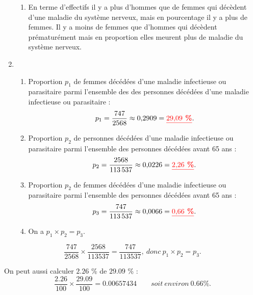 \documentclass[12pt,a4paper]{article}
\begin{document}
\begin{enumerate}[label=\arabic*.]
\begin{enumerate}[label=\alph*)]
		\item En terme d'effectifs il y a plus d'hommes que de femmes qui décèdent d'une maladie du système nerveux, mais en pourcentage il y a plus de femmes. Il y a moins de femmes que d'hommes qui décèdent prématurément mais en proportion elles meurent plus de maladie du système nerveux.
	\end{enumerate}

	\item \begin{enumerate}[label=\alph*)]
		\item Proportion $p_1$ de femmes décédées d'une maladie infectieuse ou parasitaire parmi l'ensemble des des personnes décédées d'une maladie infectieuse ou parasitaire :
		\begin{equation*}
			p_1 = \dfrac{\num{747}}{\num{2568}} \approx \num{0.2909} = \textcolor{red}{\underline{\textbf{\num{29.09} \%}}}.
		\end{equation*}
		
		\item Proportion $p_2$ de personnes décédées d'une maladie infectieuse ou parasitaire parmi l'ensemble des personnes décédées avant 65 ans :
		\begin{equation*}
			p_2 = \dfrac{\num{2568}}{\num{113537}} \approx \num{0.0226} = \textcolor{red}{\underline{\textbf{\num{2.26} \%}}}.
		\end{equation*}
		
		\item Proportion $p_2$ de femmes décédées d'une maladie infectieuse ou parasitaire parmi l'ensemble des personnes décédées avant 65 ans :
		\begin{equation*}
			p_3 = \dfrac{\num{747}}{\num{113537}} \approx \num{0.0066} = \textcolor{red}{\underline{\textbf{\num{0.66} \%}}}.
		\end{equation*}
		
		\item On a $p_1 \times p_2 = p_3$.
		
	\end{enumerate}
\end{enumerate}

\begin{myrem}
	\begin{equation*}
		\dfrac{\num{747}}{\num{2568}} \times \dfrac{\num{2568}}{\num{113537}} = \dfrac{\num{747}}{\num{113537}}, \: donc \: p_1\times p_2 = p_3.
	\end{equation*}
	
	On peut aussi calculer $\num{2.26}$ \% de $\num{29.09}$ \% :
	\begin{equation*}
		\dfrac{\num{2.26}}{\num{100}} \times \dfrac{\num{29.09}}{\num{100}} = \num{0.00657434} \qquad soit \: environ \: \num{0.66} \%.
	\end{equation*}
\end{myrem}
\end{document}
